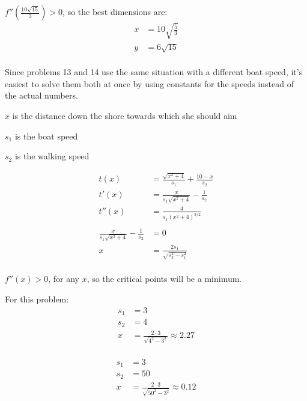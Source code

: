 \documentclass[fleqn]{exam}
\begin{document}
\begin{description}
$f''\left( \frac{10 \sqrt{15}}{3} \right) > 0$, so the best dimensions are:
\begin{align*}
  x &= 10 \sqrt{\frac{5}{3}} \\
  y &= 6 \sqrt{15} \\
\end{align*}

\pagebreak

\item[13]
Since problems 13 and 14 use the same situation with a different boat speed, it's easiest to solve them both at once by
using constants for the speeds instead of the actual numbers.
\begin{itemize*}
\item $x$ is the distance down the shore towards which she should aim
\item $s_1$ is the boat speed
\item $s_2$ is the walking speed
\end{itemize*}

\begin{align*}
  t(x)   &= \frac{\sqrt{x^2 + 4}}{s_1} + \frac{10 - x}{s_2} \\
  t'(x)  &= \frac{x}{s_1 \sqrt{x^2 + 4}} - \frac{1}{s_2} \\
  t''(x) &= \frac{4}{s_1 (x^2 + 4)^{3/2}} \\
\\
  \frac{x}{s_1 \sqrt{x^2 + 4}} - \frac{1}{s_2} &= 0 \\
  x &= \frac{2 s_1}{\sqrt{s_2^2 - s_1^2}} \\
\end{align*}


$f''(x) > 0$, for any $x$, so the critical points will be a minimum.

For this problem:
\begin{align*}
  s_1 &= 3 \\
  s_2 &= 4 \\
  x &=\frac{2 \cdot 3}{\sqrt{4^2 - 3^2}} \approx 2.27 \\
\end{align*}

\item[14]

\begin{align*}
  s_1 &= 3 \\
  s_2 &= 50 \\
  x &=\frac{2 \cdot 3}{\sqrt{50^2 - 3^2}} \approx 0.12 \\
\end{align*}


\end{description}
\end{document}
